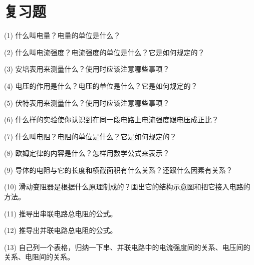 \section*{复习题}

(1) 什么叫电量？电量的单位是什么？

(2) 什么叫电流强度？电流强度的单位是什么？它是如何规定的？

(3) 安培表用来测量什么？使用时应该注意哪些事项？

(4) 电压的作用是什么？电压的单位是什么？它是如何规定的？

(5) 伏特表用来测量什么？使用时应该注意哪些事项？

(6) 什么样的实验使你认识到在同一段电路上电流强度跟电压成正比？

(7) 什么叫电阻？电阻的单位是什么？它是如何规定的？

(8) 欧姆定律的内容是什么？怎样用数学公式来表示？

(9) 导体的电阻与它的长度和横截面积有什么关系？还跟什么因素有关系？

(10) 滑动变阻器是根据什么原理制成的？画出它的结构示意图和把它接入电路的方法。

(11) 推导出串联电路总电阻的公式。

(12) 推导出并联电路总电阻的公式。

(13) 自己列一个表格，归纳一下串、并联电路中的电流强度间的关系、电压间的关系、电阻间的关系。

